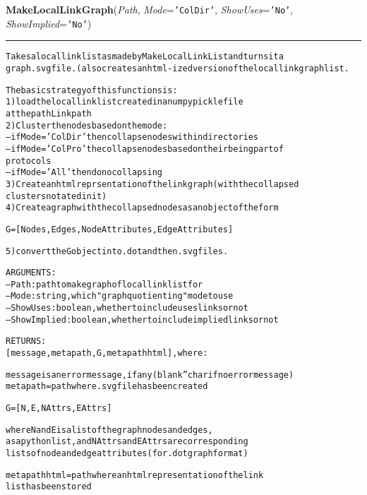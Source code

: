 \hspace{.8\funcindent}\begin{boxedminipage}{\funcwidth}

    \raggedright \textbf{MakeLocalLinkGraph}(\textit{Path}, \textit{Mode}={\tt 'ColDir'}, \textit{ShowUses}={\tt 'No'}, \textit{ShowImplied}={\tt 'No'})

    \vspace{-1.5ex}

    \rule{\textwidth}{0.5\fboxrule}
\setlength{\parskip}{2ex}
\begin{alltt}

Takes a local link list as made by MakeLocalLinkList and turns it a 
graph .svg file.  (also creates an html-ized version of the local linkgraph list.

The basic strategy of this functions is:
        1) load the local link list created in a numpy pickle file 
                at the path Linkpath
        2) Cluster the nodes based on the mode:  
                -- if Mode = 'ColDir' then collapse nodes within directories
                -- if Mode = 'ColPro' the collapse nodes based on their being part of 
                protocols
                -- if Mode = 'All' then do no collapsing
        3) Create an html reprsentation of the link graph (with the collapsed
                clusters notated in it)
        4) Create a graph with the collapsed nodes as an object of the form 
                
                G = [Nodes,Edges, NodeAttributes,EdgeAttributes]
        
        5) convert the G object into .dot and then .svg files.
        

ARGUMENTS:
--Path : path to make graph of local link list for
--Mode : string, which "graph quotienting" mode to use
--ShowUses : boolean, whether to include uses links or not
--ShowImplied : boolean, whether to include implied links or not

RETURNS:        
[message,metapath,G,metapathhtml], where:
                
        message is an error message, if any (blank '' char if no error message)
        metapath = path where .svg file has been created
        
        G = [N,E,NAttrs,EAttrs]
        
        where N and E is a list of the graph nodes and edges,
        as a python list, and NAttrs and EAttrs are corresponding
        lists of node and edge attributes (for .dot graph format)
        
        metapathhtml = path where an html representation of the link 
        list has been stored
                        
\end{alltt}

\setlength{\parskip}{1ex}
    \end{boxedminipage}

